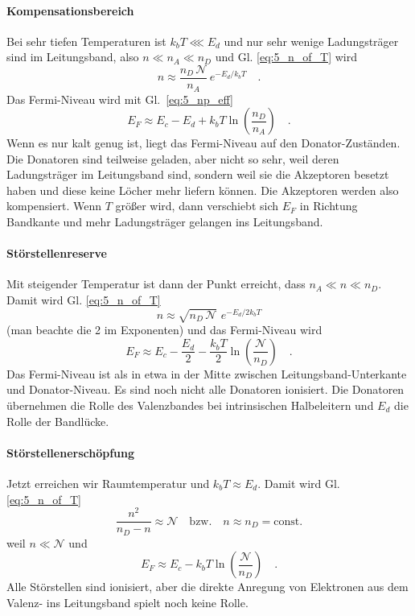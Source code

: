 \paragraph*{Kompensationsbereich} Bei sehr tiefen Temperaturen ist $k_b T \lll E_d$ und nur sehr wenige Ladungsträger sind im Leitungsband, also $n \ll n_A \ll n_D$ und Gl. \ref{eq:5_n_of_T} wird
\begin{equation}
    n  \approx \frac{n_D \, \mathcal{N}}{n_A}  \, e^{- E_d / k_b T}  \quad .
\end{equation}
Das Fermi-Niveau wird mit Gl.~\ref{eq:5_np_eff}
\begin{equation}
    E_F \approx E_c - E_d + k_b T \ln \left( \frac{n_D}{n_A} \right) \quad .
\end{equation}
Wenn es nur kalt genug ist, liegt das Fermi-Niveau auf den Donator-Zuständen. Die Donatoren sind teilweise geladen, aber nicht so sehr, weil deren Ladungsträger im Leitungsband sind, sondern weil sie die Akzeptoren besetzt haben und diese keine Löcher mehr liefern können. Die Akzeptoren werden also kompensiert. Wenn $T$ größer wird, dann verschiebt sich $E_F$ in Richtung Bandkante und mehr Ladungsträger gelangen ins Leitungsband.

\paragraph*{Störstellenreserve} Mit steigender Temperatur ist dann der Punkt erreicht, dass $n_A \ll n \ll n_D$. Damit wird   Gl. \ref{eq:5_n_of_T} 
\begin{equation}
    n \approx \sqrt{n_D \, \mathcal{N}} \,  \, e^{- E_d / 2 k_b T} 
\end{equation}
(man beachte die 2 im Exponenten) und das Fermi-Niveau wird 
\begin{equation}
    E_F \approx E_c - \frac{E_d}{2} - \frac{k_b T}{2} \ln \left( \frac{\mathcal{N}}{n_D} \right)  \quad .
\end{equation}
Das Fermi-Niveau ist als in etwa in der Mitte zwischen Leitungsband-Unterkante und Donator-Niveau. Es sind noch nicht alle Donatoren ionisiert. Die Donatoren übernehmen die Rolle des Valenzbandes bei intrinsischen Halbeleitern und $E_d$ die Rolle der Bandlücke.

\paragraph*{Störstellenerschöpfung} Jetzt erreichen wir Raumtemperatur und $k_b T \approx E_d$. Damit wird Gl. \ref{eq:5_n_of_T} 
\begin{equation}
    \frac{n^2}{n_D - n} \approx \mathcal{N}  \quad \text{bzw.} \quad n \approx n_D = \text{const.}
\end{equation}
weil $n \ll  \mathcal{N}$ und 
\begin{equation}
    E_F \approx E_c - k_b T \ln \left( \frac{\mathcal{N}}{n_D} \right) \quad .  \label{eq:5_ef_stoerstellenerschoepfung}
\end{equation}
Alle Störstellen sind ionisiert, aber die direkte Anregung von Elektronen aus dem Valenz- ins Leitungsband spielt noch keine Rolle.

